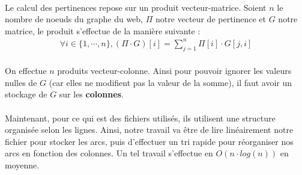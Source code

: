 		\paragraph{}Le calcul des pertinences repose sur un produit vecteur-matrice. Soient $n$ le nombre de noeuds du graphe du web, $\Pi$ notre vecteur de pertinence et $G$ notre matrice, le produit s'effectue de la manière suivante :
			\begin{align*}
				\forall i \in \{1 , \cdots , n\}, (\Pi \cdot G)[i] = \sum_{j = 1}^{n} \Pi[i] \cdot G[j, i]
			\end{align*}
		\paragraph{}On effectue $n$ produits vecteur-colonne. Ainsi pour pouvoir ignorer les valeurs nulles de $G$ (car elles ne modifient pas la valeur de la somme), il faut avoir un stockage de $G$ sur les \textbf{colonnes}.
		\paragraph{}Maintenant, pour ce qui est des fichiers utilisés, ils utilisent une structure organisée selon les lignes. Ainsi, notre travail va être de lire linéairement notre fichier pour stocker les arcs, puis d'effectuer un tri rapide pour réorganiser nos arcs en fonction des colonnes. Un tel travail s'effectue en $O(n \cdot log(n))$ en moyenne.
